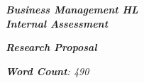 

\begin{titlepage}
    \begin{center}
        \vspace*{1cm}
            
        \date{}
            
        \huge
            
        \textit{\textbf{Business Management HL \\ Internal Assessment}}
            
        \vspace{0.25cm}
            
            
        \vspace{2.5cm}
            
            
            
        \vspace{2.5cm}
            
        \LARGE
            
        \textit{\textbf{Research Proposal}}


		\vspace{1.5cm}
            
        \vspace{2.5cm}
            
        \Large
            
        \vspace{0.25cm}
        

		\vspace{1cm}            
            
		\Large		
		        
		\vspace{0.25cm} 
		


		\textit{\textbf{Word Count}: 490}
		   
            
        \vspace{2cm}
            
        \Large
         
		\vspace{0.25cm}         
            
            
        \vspace{0.25cm}
            
           
            
    \end{center}
\end{titlepage}



